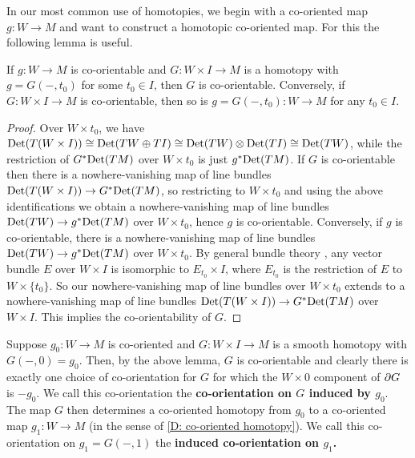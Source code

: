 In our most common use of homotopies, we begin with a co-oriented map $g \colon W \to M$ and want to construct a homotopic co-oriented map.
For this the following lemma is useful.

\begin{lemma}\label{L: co-orientable homotopies}
	If $g \colon W \to M$ is co-orientable and $G \colon W \times I \to M$ is a homotopy with $g = G(-,t_0)$ for some $t_0 \in I$, then $G$ is co-orientable.
	Conversely, if $G \colon W \times I \to M$ is co-orientable, then so is $g = G(-,t_0) \colon W \to M$ for any $t_0 \in I$.
\end{lemma}

\begin{proof}
	Over $W \times t_0$, we have ${\rm Det}(T(W \times I)) \cong {\rm Det}(TW \oplus TI) \cong {\rm Det}(TW) \otimes {\rm Det} (TI) \cong {\rm Det}(TW)$, while the restriction of $G^*{\rm Det}(TM)$ over $W \times t_0$ is just $g^*{\rm Det}(TM)$.
	If $G$ is co-orientable then there is a nowhere-vanishing map of line bundles ${\rm Det}(T(W \times I)) \to G^*{\rm Det}(TM)$, so restricting to $W \times t_0$ and using the above identifications we obtain a nowhere-vanishing map of line bundles ${\rm Det}(TW) \to g^*{\rm Det}(TM)$ over $W \times t_0$, hence $g$ is co-orientable.
	Conversely,
	if $g$ is co-orientable, there is a nowhere-vanishing map of line bundles ${\rm Det}(TW) \to g^*{\rm Det}(TM)$ over $W \times t_0$.
	By general bundle theory \cite[Theorem 3.4.4]{Hus94}, any vector bundle $E$ over $W \times I$ is isomorphic to $E_{t_0} \times I$, where $E_{t_0}$ is the restriction of $E$ to $W \times \{t_0\}$.
	So our nowhere-vanishing map of line bundles over $W \times t_0$ extends to a nowhere-vanishing map of line bundles ${\rm Det}(T(W \times I)) \to G^*{\rm Det}(TM)$ over $W \times I$.
	This implies the co-orientability of $G$.
\end{proof}

\begin{definition}\label{D: homotopy co-orientation}
	Suppose $g_0 \colon W \to M$ is co-oriented and $G \colon W \times I \to M$ is a smooth homotopy with $G(-,0) = g_0$.
	Then, by the above lemma, $G$ is co-orientable and clearly there is exactly one choice of co-orientation for $G$ for which the $W \times 0$ component of $\partial G$ is $-g_0$.
	We call this co-orientation the \textbf{co-orientation on $G$ induced by $g_0$}.
	The map $G$ then determines a co-oriented homotopy from $g_0$ to a co-oriented map $g_1 \colon W \to M$ (in the sense of \cref{D: co-oriented homotopy}).
	We call this co-orientation on $g_1 = G(-,1)$ the \textbf{induced co-orientation on $g_1$.}
\end{definition}

